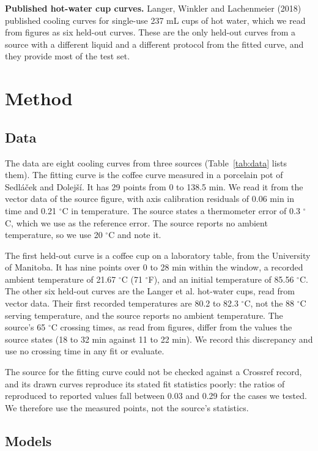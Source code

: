 \documentclass[11pt,letterpaper]{article}
\begin{document}
\textbf{Published hot-water cup curves.} Langer, Winkler and Lachenmeier (2018) published cooling curves for single-use 237 mL cups of hot water, which we read from figures as six held-out curves. These are the only held-out curves from a source with a different liquid and a different protocol from the fitted curve, and they provide most of the test set.

\section{Method}

\subsection{Data}\label{sec:data}

The data are eight cooling curves from three sources (Table~\ref{tab:data} lists them). The fitting curve is the coffee curve measured in a porcelain pot of Sedláček and Dolejší. It has 29 points from 0 to 138.5 min. We read it from the vector data of the source figure, with axis calibration residuals of 0.06 min in time and 0.21 $^\circ$C in temperature. The source states a thermometer error of 0.3 $^\circ$C, which we use as the reference error. The source reports no ambient temperature, so we use 20 $^\circ$C and note it.

The first held-out curve is a coffee cup on a laboratory table, from the University of Manitoba. It has nine points over 0 to 28 min within the window, a recorded ambient temperature of 21.67 $^\circ$C (71 $^\circ$F), and an initial temperature of 85.56 $^\circ$C. The other six held-out curves are the Langer et al. hot-water cups, read from vector data. Their first recorded temperatures are 80.2 to 82.3 $^\circ$C, not the 88 $^\circ$C serving temperature, and the source reports no ambient temperature. The source's 65 $^\circ$C crossing times, as read from figures, differ from the values the source states (18 to 32 min against 11 to 22 min). We record this discrepancy and use no crossing time in any fit or evaluate.

The source for the fitting curve could not be checked against a Crossref record, and its drawn curves reproduce its stated fit statistics poorly: the ratios of reproduced to reported values fall between 0.03 and 0.29 for the cases we tested. We therefore use the measured points, not the source's statistics.

\subsection{Models}
\end{document}

